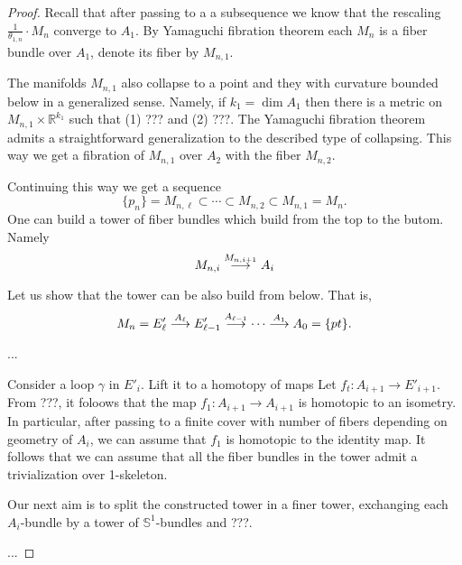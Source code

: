 \documentclass{amsart}
\begin{document}
\begin{proof}
Recall that after passing to a a subsequence we know that the rescaling $\tfrac1{\theta_{1,n}}\cdot M_n$ converge to $A_1$.
By Yamaguchi fibration theorem each $M_n$ is a fiber bundle over $A_1$,
denote its fiber by $M_{n,1}$.

The manifolds $M_{n,1}$ also collapse to a point and they with curvature bounded below in a generalized sense.
Namely, if $k_1=\dim A_1$ then there is a metric on $M_{n,1}\times\mathbb{R}^{k_1}$ such that (1) ??? and (2) ???.
The Yamaguchi fibration theorem admits a straightforward generalization to the described type of collapsing.
This way we get a fibration of $M_{n,1}$ over $A_2$ with the fiber $M_{n,2}$.

Continuing this way we get a sequence 
$$\{p_n\}=M_{n,\ell}\subset \cdots \subset M_{n,2}\subset M_{n,1}=M_n.$$
One can build a tower of fiber bundles which build from the top to the butom.
Namely 
$$M_{n,i}\buildrel{M_{n,i+1}}\over\longrightarrow A_i$$

Let us show that the tower can be also build from below.
That is,
$$M_n=E_\ell'\buildrel {A_\ell}\over \longrightarrow E_{\ell-1}'\buildrel {A_{\ell-1}}\over\longrightarrow\dots\buildrel {A_1}\over\longrightarrow A_0=\{pt\}.$$

...

Consider a loop $\gamma$ in $E'_i$.
Lift it to a homotopy of maps 
Let $f_t\colon A_{i+1}\to E'_{i+1}$.
From ???, it foloows that the map $f_1\colon A_{i+1}\to A_{i+1}$ is homotopic to an isometry.
In particular, after passing to a finite cover with number of fibers depending on geometry of $A_i$,
we can assume that $f_1$ is homotopic to the identity map.
It follows that we can assume that all the fiber bundles in the tower admit a trivialization over 1-skeleton.

Our next aim is to split the constructed tower in a finer tower, exchanging each $A_i$-bundle by a tower of $\mathbb{S}^1$-bundles and ???.


...



\end{proof}


\small

%
\end{document}
